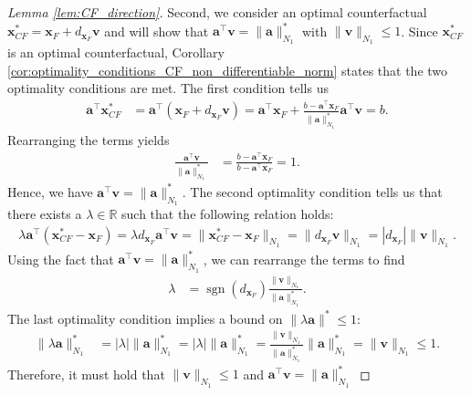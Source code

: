 \documentclass[10pt,a4paper]{amsart}
\DeclareMathOperator*{\sgn}{sgn}
\begin{document}
\begin{proof}[Lemma \ref{lem:CF_direction}]
    Second, we consider an optimal counterfactual $\bm{x}_{CF}^*= \bm{x}_{F}+d_{\bm{x}_F}\bm{v}$ and will show that $\bm{a}^{\top}\bm{v}=\|\bm{a}\|_{N_1}^*$ with $\|\bm{v}\|_{N_1}\leq 1$. Since $\bm{x}_{CF}^*$ is an optimal counterfactual, Corollary \ref{cor:optimality_conditions_CF_non_differentiable_norm} states that the two optimality conditions are met. The first condition tells us
    \begin{align*}
        \bm{a}^\top \bm{x}_{CF}^* &= \bm{a}^\top (\bm{x}_F+d_{\bm{x}_F}\bm{v})= \bm{a}^\top\bm{x}_F +\frac{b-\bm{a}^{\top}\bm{x}_F}{\|\bm{a}\|_{N_1}^*}\bm{a}^\top\bm{v}=b.
    \end{align*}
    Rearranging the terms yields
    \begin{align*}
        \frac{\bm{a}^\top\bm{v}}{\|\bm{a}\|_{N_1}^*}&=\frac{b-\bm{a}^{\top}\bm{x}_F}{b-\bm{a}^{\top}\bm{x}_F}=1.
    \end{align*}
    Hence, we have $\bm{a}^\top\bm{v}=\|\bm{a}\|_{N_1}^*$. The second optimality condition tells us that there exists a $\lambda\in\mathbb{R}$ such that the following relation holds:
    \begin{align*}
        \lambda \bm{a}^\top (\bm{x}_{CF}^* - \bm{x}_F) =\lambda d_{\bm{x}_F}\bm{a}^\top\bm{v}=\|\bm{x}_{CF}^* - \bm{x}_F\|_{N_1}=\|d_{\bm{x}_F}\bm{v}\|_{N_1}= |d_{\bm{x}_F}|\|\bm{v}\|_{N_1}.
    \end{align*}
    Using the fact that $\bm{a}^\top\bm{v}=\|\bm{a}\|_{N_1}^*$, we can rearrange the terms to find
    \begin{align*}
        \lambda&=\sgn(d_{\bm{x}_F})\frac{\|\bm{v}\|_{N_1}}{\|\bm{a}\|_{N_1}^*}.
    \end{align*}
    The last optimality condition implies a bound on $\|\lambda \bm a\|^*\leq 1$:
    \begin{align*}
        \|\lambda \bm a\|_{N_1}^*& = |\lambda| \|\bm{a}\|_{N_1}^* = |\lambda| \|\bm{a}\|_{N_1}^* = \frac{\|\bm{v}\|_{N_1}}{\|\bm{a}\|_{N_1}^*}\|\bm{a}\|_{N_1}^*=\|\bm{v}\|_{N_1}\leq 1.
    \end{align*}
    Therefore, it must hold that $\|\bm{v}\|_{N_1}\leq 1$ and $\bm{a}^{\top}\bm{v}=\|\bm{a}\|_{N_1}^*$
\end{proof}
\end{document}
